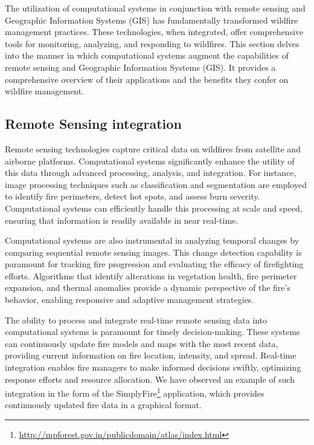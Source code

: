 \documentclass[
  12 pt,
]{Nemilov}
\begin{document}
The utilization of computational systems in conjunction with remote sensing and Geographic Information Systems (GIS) has fundamentally transformed wildfire management practices. These technologies, when integrated, offer comprehensive tools for monitoring, analyzing, and responding to wildfires. This section delves into the manner in which computational systems augment the capabilities of remote sensing and Geographic Information Systems (GIS). It provides a comprehensive overview of their applications and the benefits they confer on wildfire management.

\subsection{Remote Sensing integration}\label{remote-sensing-integration}

Remote sensing technologies capture critical data on wildfires from satellite and airborne platforms. Computational systems significantly enhance the utility of this data through advanced processing, analysis, and integration. For instance, image processing techniques such as classification and segmentation are employed to identify fire perimeters, detect hot spots, and assess burn severity. Computational systems can efficiently handle this processing at scale and speed, ensuring that information is readily available in near real-time.

Computational systems are also instrumental in analyzing temporal changes by comparing sequential remote sensing images. This change detection capability is paramount for tracking fire progression and evaluating the efficacy of firefighting efforts. Algorithms that identify alterations in vegetation health, fire perimeter expansion, and thermal anomalies provide a dynamic perspective of the fire's behavior, enabling responsive and adaptive management strategies.

The ability to process and integrate real-time remote sensing data into computational systems is paramount for timely decision-making. These systems can continuously update fire models and maps with the most recent data, providing current information on fire location, intensity, and spread. Real-time integration enables fire managers to make informed decisions swiftly, optimizing response efforts and resource allocation. We have observed an example of such integration in the form of the SimplyFire\footnote{\url{http://mpforest.gov.in/publicdomain/atlas/index.html}} application, which provides continuously updated fire data in a graphical format.
\end{document}
